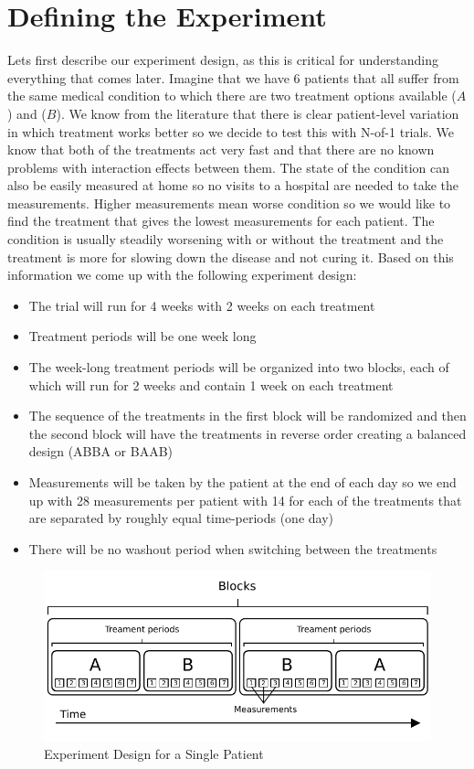 \documentclass[12pt,a4paper,leqno]{report}
\theoremstyle{plain}
\theoremstyle{definition}
\theoremstyle{remark}
\begin{document}
\section{Defining the Experiment}

Lets first describe our experiment design, as this is critical for understanding
everything that comes later. Imagine that we have 6 patients that all suffer from the
same medical condition to which there are two treatment options available (\(A\)) and (\(B\)). We know from the
literature that there is clear patient-level variation in which treatment works better
so we decide to test this with N-of-1 trials. We know that both of the treatments act
very fast and that there are no known problems with interaction effects between them.
The state of the condition can also be easily measured at home so no visits to
a hospital are needed to take the measurements. Higher measurements mean worse condition
so we would like to find the treatment that gives the lowest measurements for each patient. The condition is usually steadily
worsening with or without the treatment and the treatment is more for slowing down the
disease and not curing it. Based on this information we come up with the following experiment design:

\begin{itemize}
    \item The trial will run for 4 weeks with 2 weeks on each treatment
    \item Treatment periods will be one week long
    \item The week-long treatment periods will be organized into two blocks, each of which will run for
    2 weeks and contain 1 week on each treatment
    \item The sequence of the treatments in the first block will be randomized and then
    the second block will have the treatments in reverse order creating a balanced
    design (ABBA or BAAB)
    \item Measurements will be taken by the patient at the end of each day so we end up with
    28 measurements per patient with 14 for each of the treatments that are separated by
    roughly equal time-periods (one day)
    \item There will be no washout period when switching between the treatments
\end{itemize}

\begin{figure}[H]
    \centering
    \caption{Experiment Design for a Single Patient}\label{singlepatientexperimentdesign}
    \includegraphics{design_for_simulated_experiment.pdf}
\end{figure}
\end{document}
